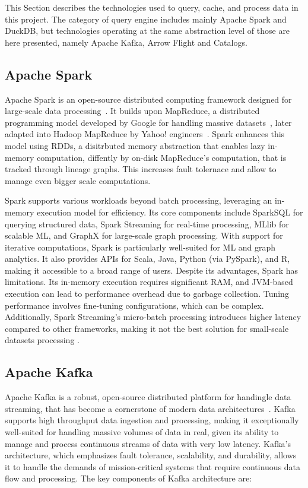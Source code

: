 This Section describes the technologies used to query, cache, and process data in this project. The category of query engine includes mainly Apache Spark and DuckDB, but technologies operating at the same abstraction level of those are here presented, namely Apache Kafka, Arrow Flight and Catalogs.

\subsection{Apache Spark}
Apache Spark is an open-source distributed computing framework designed for large-scale data processing~\cite{zahariaApacheSparkUnified2016}. It builds upon MapReduce, a distributed programming model developed by Google for handling massive datasets~\cite{dean2004mapreduce}, later adapted into Hadoop MapReduce by Yahoo! engineers~\cite{borthakurHadoopDistributedFile2005}. Spark enhances this model using \glspl{RDD}\cite{Zaharia:EECS-2011-82}, a disitrbuted memory abstraction that enables lazy in-memory computation, diffently by on-disk MapReduce's computation, that is tracked through lineage graphs. This increases fault tolernace \cite{Zaharia:EECS-2011-82} and allow to manage even bigger scale computations.

Spark supports various workloads beyond batch processing, leveraging an in-memory execution model for efficiency. Its core components include SparkSQL for querying structured data, Spark Streaming for real-time processing, MLlib for scalable \gls{ML}, and GraphX for large-scale graph processing. With support for iterative computations, Spark is particularly well-suited for \gls{ML} and graph analytics. It also provides \glspl{API} for Scala, Java, Python (via PySpark), and R, making it accessible to a broad range of users. Despite its advantages, Spark has limitations. Its in-memory execution requires significant RAM, and \gls{JVM}-based execution can lead to performance overhead due to garbage collection. Tuning performance involves fine-tuning configurations, which can be complex. Additionally, Spark Streaming's micro-batch processing introduces higher latency compared to other frameworks, making it not the best solution for small-scale datasets processing \cite{BenchmarkResultsSpark}.

\subsection{Apache Kafka}
\label{subsec:back_apache_kafka}
Apache Kafka is a robust, open-source distributed platform for handingle data streaming, that has become a cornerstone of modern data architectures~\cite{krepsKafkaDistributedMessaging2011}. Kafka supports high throughput data ingestion and processing, making it exceptionally well-suited for handling massive volumes of data in real, given its ability to manage and process continuous streams of data with very low latency. Kafka's architecture, which emphasizes fault tolerance, scalability, and durability, allows it to handle the demands of mission-critical systems that require continuous data flow and processing.  The key components of Kafka architecture are:

